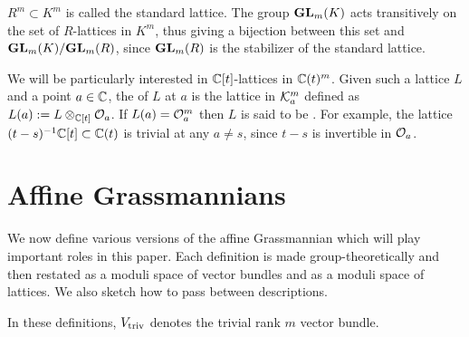 \documentclass{article}
\begin{document}
$ R^m \subset K^m $ is called the standard lattice. The group ${\mathbf{GL}}_m(K) $ acts transitively on the set of $R$-lattices in $K^m$, thus giving a bijection between this set and ${\mathbf{GL}}_m(K)/{\mathbf{GL}}_m(R)$, since $ {\mathbf{GL}}_m(R) $ is the stabilizer of the standard lattice. 

We will be particularly interested in $\mathbb C[t]$-lattices in $ \mathbb C(t)^m$. Given such a lattice $ L $ and a point $ a \in \mathbb C$, the  of $ L $ at $ a $ is the lattice in $\mathcal K_a^m$ defined as $ L(a) := L \otimes_{\mathbb C[t]} \mathcal O_a $. 
If $L(a) = \mathcal O_a^m$ then $L$ is said to be . 
For example, the lattice $(t-s)^{-1}\mathbb C[t] \subset \mathbb C(t)$ is trivial at any $a\ne s$, since $ t-s $ is invertible in $ \mathcal O_a$. 

\section{Affine Grassmannians} 
\label{s:affgrs}
% 
We now define various versions of the affine Grassmannian which will play important roles in this paper. 
% 
Each definition is made group-theoretically and then restated as a moduli space of vector bundles and as a moduli space of lattices.
% 
We also sketch how to pass between descriptions.  

In these definitions, $ V_{\mathrm{triv}}$ denotes the trivial rank $ m $ vector bundle. 
\end{document}
